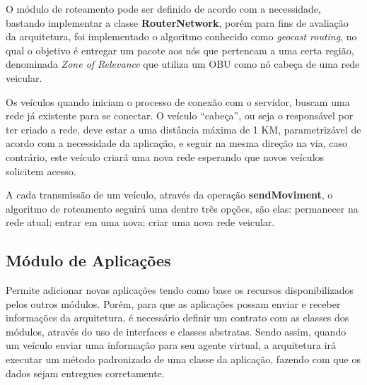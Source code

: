 \documentclass[
	12pt,				%
	oneside,			%
	a4paper,			%
	english,			%
	brazil				%
	]{abntex2ppgsi}
\begin{document}
O módulo de roteamento pode ser definido de acordo com a necessidade, bastando implementar a classe \textbf{RouterNetwork}, porém para fins de avaliação da arquitetura, foi implementado  o algoritmo conhecido como \textit{geocast routing}, no qual o objetivo é entregar um pacote aos nós que pertencam a uma certa região, denominada \textit{Zone of Relevance} que utiliza um OBU como nó cabeça de uma rede veicular.

Os veículos quando iniciam o processo de conexão com o servidor, buscam uma rede  já existente para se conectar. O veículo ``cabeça'', ou seja o responsável por ter criado a rede, deve estar a uma distância máxima de 1 KM, parametrizável de acordo com a necessidade da aplicação, e seguir na mesma direção na via, caso contrário, este veículo criará uma nova rede esperando que novos veículos solicitem acesso.

A cada transmissão de um veículo, através da operação \textbf{sendMoviment}, o algoritmo de roteamento seguirá uma dentre três opções, são elas: permanecer na rede atual; entrar em uma nova; criar uma nova rede veicular.




\subsection{Módulo de Aplicações}
Permite adicionar novas aplicações tendo como base os recursos disponibilizados pelos outros módulos. Porém, para que as aplicações possam enviar e receber informações da arquitetura, é necessário definir um contrato com as classes dos módulos, através do uso de interfaces e classes abstratas. Sendo assim, quando um veículo enviar uma informação para seu agente virtual, a arquitetura irá executar um método padronizado de uma classe da aplicação, fazendo com que os dados sejam entregues corretamente.
\end{document}
